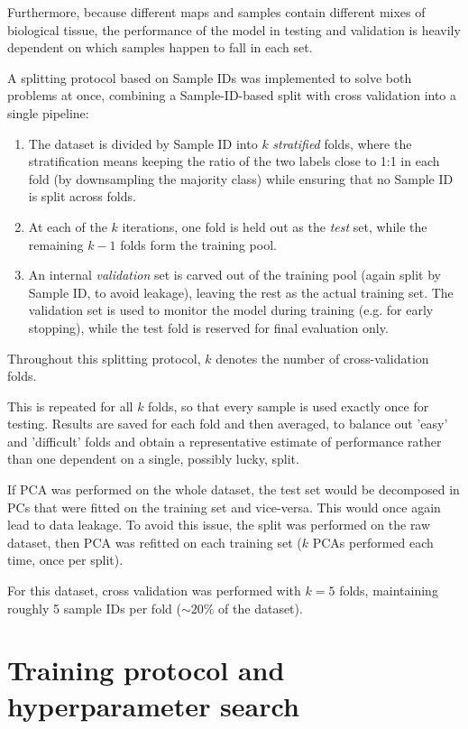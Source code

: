 Furthermore, because different maps and samples contain different mixes of biological tissue, the performance of the model in testing and validation is heavily dependent on which samples happen to fall in each set.

A splitting protocol based on Sample IDs was implemented to solve both problems at once, combining a Sample-ID-based split with cross validation into a single pipeline:
\begin{enumerate}
    \item The dataset is divided by Sample ID into $k$ \textit{stratified} folds, where the stratification means keeping the ratio of the two labels close to 1:1 in each fold (by downsampling the majority class) while ensuring that no Sample ID is split across folds.
    \item At each of the $k$ iterations, one fold is held out as the \textit{test} set, while the remaining $k-1$ folds form the training pool.
    \item An internal \textit{validation} set is carved out of the training pool (again split by Sample ID, to avoid leakage), leaving the rest as the actual training set. The validation set is used to monitor the model during training (e.g. for early stopping), while the test fold is reserved for final evaluation only.
\end{enumerate}

Throughout this splitting protocol, $k$ denotes the number of cross-validation folds.

This is repeated for all $k$ folds, so that every sample is used exactly once for testing. Results are saved for each fold and then averaged, to balance out 'easy' and 'difficult' folds and obtain a representative estimate of performance rather than one dependent on a single, possibly lucky, split.

If PCA was performed on the whole dataset, the test set would be decomposed in PCs that were fitted on the training set and vice-versa. This would once again lead to data leakage. To avoid this issue, the split was performed on the raw dataset, then PCA was refitted on each training set ($k$ PCAs performed each time, once per split).

For this dataset, cross validation was performed with $k=5$ folds, maintaining roughly 5 sample IDs per fold ($\sim20\%$ of the dataset).


\section{Training protocol and hyperparameter search}
\label{sec:training}

